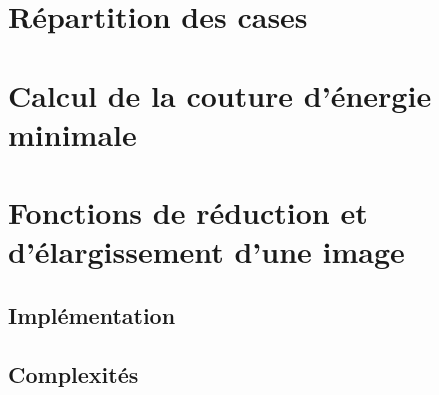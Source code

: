 
\usepackage{clrscode3e}





\section{Répartition des cases} %
\subsection{} %
\subsection{} %
\subsection{} %
\subsection{} %
\subsection{} %

\setcounter{section}{0}

\section{Calcul de la couture d'énergie minimale} %
\subsection{} %
\subsection{} %
\subsection{} %
\subsection{} %
\subsection{} %


\section{Fonctions de réduction et d'élargissement d'une image} %
\subsection{Implémentation} %
\subsection{Complexités} %

